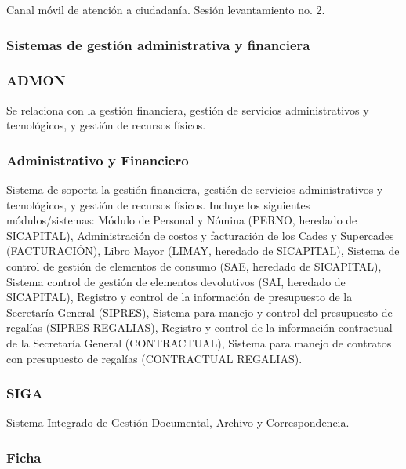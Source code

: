 \documentclass[
	a4paper, %
	12pt, %
]{include/CSSullivanBusinessReport}
\begin{document}
Canal móvil de atención a ciudadanía. Sesión levantamiento no. 2.

\subsubsection{Sistemas de gestión administrativa y
financiera}\label{sec:sistemas-de-gestiuxf3n-administrativa-y-financiera}

\subsubsection{ADMON}\label{sec:admon}

Se relaciona con la gestión financiera, gestión de servicios
administrativos y tecnológicos, y gestión de recursos físicos.

\subsubsection{Administrativo y
Financiero}\label{sec:administrativo-y-financiero}

Sistema de soporta la gestión financiera, gestión de servicios
administrativos y tecnológicos, y gestión de recursos físicos. Incluye
los siguientes módulos/sistemas: Módulo de Personal y Nómina (PERNO,
heredado de SICAPITAL), Administración de costos y facturación de los
Cades y Supercades (FACTURACIÓN), Libro Mayor (LIMAY, heredado de
SICAPITAL), Sistema de control de gestión de elementos de consumo (SAE,
heredado de SICAPITAL), Sistema control de gestión de elementos
devolutivos (SAI, heredado de SICAPITAL), Registro y control de la
información de presupuesto de la Secretaría General (SIPRES), Sistema
para manejo y control del presupuesto de regalías (SIPRES REGALIAS),
Registro y control de la información contractual de la Secretaría
General (CONTRACTUAL), Sistema para manejo de contratos con presupuesto
de regalías (CONTRACTUAL REGALIAS).

\subsubsection{SIGA}\label{sec:siga}

Sistema Integrado de Gestión Documental, Archivo y Correspondencia.

\subsubsection{Ficha}\label{sec:ficha-2}
\end{document}
